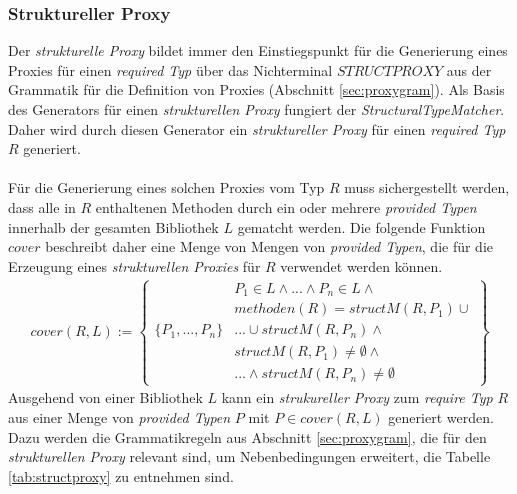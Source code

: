 \documentclass[a4paper,12pt]{article}
\begin{document}
\subsubsection{Struktureller Proxy}
Der \emph{strukturelle Proxy} bildet immer den Einstiegspunkt für die Generierung eines Proxies für einen \emph{required Typ} über das Nichterminal $\mathit{STRUCTPROXY}$ aus der Grammatik für die Definition von Proxies (Abschnitt \ref{sec:proxygram}). Als Basis des Generators für einen \emph{strukturellen Proxy} fungiert der \emph{StructuralTypeMatcher}.
Daher wird durch diesen Generator ein \emph{struktureller Proxy} für einen \emph{required Typ} $R$ generiert.\\\\
Für die Generierung eines solchen Proxies vom Typ $R$ muss sichergestellt werden, dass alle in $R$ enthaltenen
Methoden durch ein oder mehrere \emph{provided Typen} innerhalb der gesamten Bibliothek $L$ gematcht werden. Die folgende Funktion $\mathit{cover}$ beschreibt daher eine Menge von Mengen von \emph{provided Typen}, die für die Erzeugung eines \emph{strukturellen Proxies} für $R$ verwendet werden können.
\begin{gather*}
cover(R,L) := 
\left\{\begin{array}{l|l}
					& P_1 \in L \wedge \text{...} \wedge P_n \in L \wedge \\
					& methoden(R) = structM(R,P_1) \cup \\
	\{P_1,...,P_n\}	& \texttt{...} \cup structM(R, P_n) \wedge \\
					& \mathit{structM(R,P_1)} \neq \emptyset \wedge \\
					& \texttt{...}\wedge \mathit{structM(R,P_n)} \neq \emptyset 
\end{array}\right\}
\end{gather*}
Ausgehend von einer Bibliothek $L$ kann ein \emph{strukureller Proxy} zum \emph{require Typ} $R$ aus einer Menge von \emph{provided Typen} $P$ mit $P \in \mathit{cover(R,L)}$ generiert werden. Dazu werden die Grammatikregeln aus Abschnitt \ref{sec:proxygram}, die für den \emph{strukturellen Proxy} relevant sind, um Nebenbedingungen erweitert, die Tabelle \ref{tab:structproxy} zu entnehmen sind.
\end{document}
